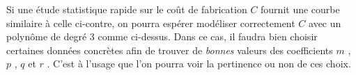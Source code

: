 \vspace{-2em}

\begin{figure} 
	\begin{center}
	\end{center}
	\vspace{-2em}
\end{figure} 

Si une étude statistique rapide sur le coût de fabrication $C$ fournit une courbe similaire à celle ci-contre, on pourra espérer modéliser correctement $C$ avec un polynôme de degré 3 comme ci-dessus. Dans ce cas, il faudra bien choisir  certaines données concrètes afin de trouver de \emph{\og bonnes \fg} valeurs des coefficients $m$ , $p$ , $q$ et $r$ . C'est à l'usage que l'on pourra voir la pertinence ou non de ces choix.


